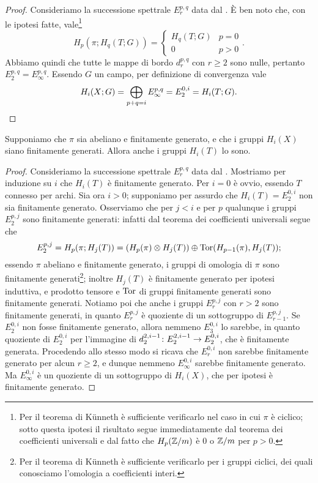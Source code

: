 \begin{proof}
Consideriamo la successione spettrale \(E^{p,q}_r\) data dal . È ben noto che, con le ipotesi fatte, vale\footnote{Per il teorema di Künneth è sufficiente verificarlo nel caso in cui \(\pi\) è ciclico; sotto questa ipotesi il risultato segue immediatamente dal teorema dei coefficienti universali e dal fatto che \(H_p(\mathbb{Z}/m)\) è \(0\) o \(\mathbb{Z}/m\) per \(p>0\).}
\[
H_p(\pi;H_q(T;G))=
\begin{cases}
H_q(T;G)&p=0\\
0&p>0
\end{cases}.
\]
Abbiamo quindi che tutte le mappe di bordo \(d^{p,q}_r\) con \(r\ge 2\) sono nulle, pertanto \(E^{p,q}_2=E^{p,q}_\infty\). Essendo \(G\) un campo, per definizione di convergenza vale
\[
H_i(X;G)=\bigoplus_{p+q=i}E^{p,q}_\infty=E^{0,i}_2=H_i(T;G).\qedhere
\]
\end{proof}

\begin{proposition}
Supponiamo che \(\pi\) sia abeliano e finitamente generato, e che i gruppi \(H_i(X)\) siano finitamente generati. Allora anche i gruppi \(H_i(T)\) lo sono.
\end{proposition}
\begin{proof}
Consideriamo la successione spettrale \(E^{p,q}_r\) data dal . Mostriamo per induzione su \(i\) che \(H_i(T)\) è finitamente generato. Per \(i=0\) è ovvio, essendo \(T\) connesso per archi. Sia ora \(i>0\); supponiamo per assurdo che \(H_i(T)=E^{0,i}_2\) non sia finitamente generato. Osserviamo che per \(j<i\) e per \(p\) qualunque i gruppi \(E^{p,j}_2\) sono finitamente generati: infatti dal teorema dei coefficienti universali segue che
\[
E^{p,j}_2=H_p(\pi;H_j(T))=(H_p(\pi)\mathbin{\otimes} H_j(T))\mathbin{\oplus}\operatorname{Tor}(H_{p-1}(\pi),H_j(T));
\]
essendo \(\pi\) abeliano e finitamente generato, i gruppi di omologia di \(\pi\) sono finitamente generati\footnote{Per il teorema di Künneth è sufficiente verificarlo per i gruppi ciclici, dei quali conosciamo l'omologia a coefficienti interi.}; inoltre \(H_j(T)\) è finitamente generato per ipotesi induttiva, e prodotto tensore e \(\operatorname{Tor}\) di gruppi finitamente generati sono finitamente generati. Notiamo poi che anche i gruppi \(E^{p,j}_r\) con \(r>2\) sono finitamente generati, in quanto \(E^{p,j}_r\) è quoziente di un sottogruppo di \(E^{p,j}_{r-1}\). Se \(E^{0,i}_2\) non fosse finitamente generato, allora nemmeno \(E^{0,i}_3\) lo sarebbe, in quanto quoziente di \(E^{0,i}_2\) per l'immagine di \(\map{d^{2,i-1}_2}{E^{2,i-1}_2}{E^{0,i}_2}\), che è finitamente generata. Procedendo allo stesso modo si ricava che \(E^{0,i}_r\) non sarebbe finitamente generato per alcun \(r\ge 2\), e dunque nemmeno \(E^{0,i}_\infty\) sarebbe finitamente generato. Ma \(E^{0,i}_\infty\) è un quoziente di un sottogruppo di \(H_i(X)\), che per ipotesi è finitamente generato.
\end{proof}